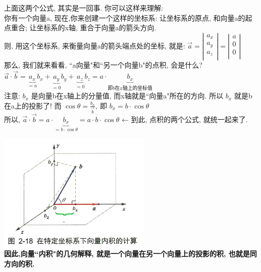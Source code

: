 \documentclass[UTF8]{ctexart}
\begin{document}
\begin{myEnvSample}
上面这两个公式, 其实是一回事. 你可以这样来理解: \\
你有一个向量a, 现在,你来创建一个这样的坐标系: 让坐标系的原点, 和向量a的起点重合; 让坐标系的x轴, 重合于向量a的箭头方向. \\
则, 用这个坐标系, 来衡量向量a的箭头端点处的坐标, 就是: $
\overrightarrow{a}=\left| \begin{array}{l}
	a_x\\
	a_y\\
	a_z\\
\end{array} \right|=\left| \begin{array}{l}
	a\\
	0\\
	0\\
\end{array} \right|
$\\

那么, 我们就来看看, ``a向量"和``另一个向量b"的点积, 会是什么? \\
$
\overrightarrow{a}\cdot \overrightarrow{b}=\underset{=a}{\underbrace{a_x}}b_x+\underset{=0}{\underbrace{a_y}}b_y+\underset{=0}{\underbrace{a_z}}b_z=a\cdot \underset{\text{即}b\text{在}x\text{轴上的坐标值}}{\underbrace{b_x}}
$\\

注意: $b_x$ 是向量b在x轴上的分量值, 而x轴就是``向量a"所在的方向. 所以 $b_x$ 就是b在a上的投影了! 而 $
\cos \theta =\frac{b_x}{\overrightarrow{b}},\ \text{即\ }b_x=b\cdot \cos \theta 
$\\

所以, $
\overrightarrow{a}\cdot \overrightarrow{b}=a\cdot \underset{=b\cdot \cos \theta}{\underbrace{b_x}}=a\cdot b\cdot \cos \theta 
$ ← 到此, 点积的两个公式, 就统一起来了. 

\includegraphics[width=0.55\textwidth]{img/0127.png}\\

\textbf{因此,向量``内积"的几何解释, 就是一个向量在另一个向量上的投影的积, 也就是同方向的积.}
\end{myEnvSample}
\end{document}
